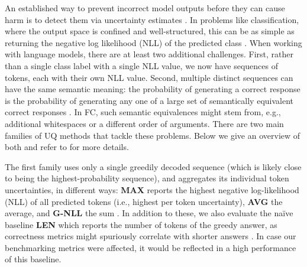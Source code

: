 An established way to prevent incorrect model outputs before they can cause harm is to detect them via uncertainty estimates \citep{chow1957optim}. 
In problems like classification, where the output space is confined and well-structured, this can be as simple as returning the negative log likelihood (NLL) of the predicted class %
\citep{galil2023what}. When working with language models, there are at least two additional challenges.
First, rather than a single class label with a single NLL value, we now have sequences of tokens, each with their own NLL value. Second, multiple distinct sequences can have the same semantic meaning: the probability of generating a correct response is the probability of generating any one of a large set of semantically equivalent correct responses \citep{kuhn2023semantic}.
In FC, such semantic equivalences might stem from, e.g., additional whitespaces or a different order of arguments. There are two main families of UQ methods that tackle these problems. Below we give an overview of both and refer to  for more details.

The first family uses only a single greedily decoded sequence (which is likely close to being the highest-probability sequence), 
and aggregates its individual token uncertainties, in different ways: 
\textbf{MAX} reports the highest negative log-likelihood (NLL) of all predicted tokens (i.e., highest per token uncertainty), 
\textbf{AVG} the average,
and \textbf{G-NLL} the sum \citep{aichberger2024rethi, fadeeva2023, vashurin2025benchmarkinguncertaintyquantificationmethods}. 
In addition to these,
we also evaluate the na\"{i}ve baseline \textbf{LEN} which reports the number of tokens of the greedy answer, as correctness metrics might spuriously correlate with shorter answers \citep{santilli2024on}. 
In case our benchmarking metrics were affected, it would be reflected in a high performance of this baseline.

